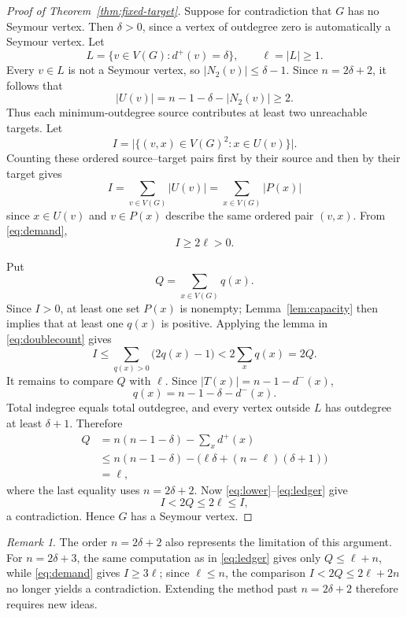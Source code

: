 \documentclass[12pt]{article}
\theoremstyle{plainsl}
\theoremstyle{remark}
\newtheorem*{remark}{Remark}
\begin{document}
\begin{proof}[Proof of Theorem~\ref{thm:fixed-target}]
Suppose for contradiction that $G$ has no Seymour vertex.  Then $\delta>0$,
since a vertex of outdegree zero is automatically a Seymour vertex.  Let
\[
 L=\{v\in V(G):d^+(v)=\delta\},
 \qquad \ell=|L|\ge1.
\]
Every $v\in L$ is not a Seymour vertex, so $|N_2(v)|\le\delta-1$.
Since $n=2\delta+2$, it follows that
\begin{equation}\label{eq:demand}
 |U(v)|=n-1-\delta-|N_2(v)|\ge2.
\end{equation}
Thus each minimum-outdegree source contributes at least two unreachable
targets. Let
\[
 I=\bigl|\{(v,x)\in V(G)^2:x\in U(v)\}\bigr|.
\]
Counting these ordered source--target pairs first by their source and then by
their target gives
\begin{equation}\label{eq:doublecount}
 I=\sum_{v\in V(G)}|U(v)|
 =\sum_{x\in V(G)}|P(x)|
\end{equation}
since $x\in U(v)$ and $v\in P(x)$ describe the
same ordered pair $(v,x)$.  From \eqref{eq:demand},
\begin{equation}\label{eq:lower}
 I\ge2\ell>0.
\end{equation}

\noindent Put
\[
 Q=\sum_{x\in V(G)}q(x).
\]
Since $I>0$, at least one set $P(x)$ is nonempty; Lemma~\ref{lem:capacity}
then implies that at least one $q(x)$ is positive.  Applying the lemma
in \eqref{eq:doublecount} gives
\begin{equation}\label{eq:capacity}
 I\le\sum_{q(x)>0}\bigl(2q(x)-1\bigr)
   <2\sum_xq(x)=2Q.
\end{equation}
It remains to compare $Q$ with $\ell$.  Since
$|T(x)|=n-1-d^-(x)$,
\[
 q(x)=n-1-\delta-d^-(x).
\]
Total indegree equals total outdegree, and every vertex outside $L$ has
outdegree at least $\delta+1$.  Therefore
\begin{equation}\label{eq:ledger}
\begin{aligned}
 Q
 &=n(n-1-\delta)-\sum_xd^+(x)\\
 &\le n(n-1-\delta)
   -\bigl(\ell\delta+(n-\ell)(\delta+1)\bigr)\\
 &=\ell,
\end{aligned}
\end{equation}
where the last equality uses $n=2\delta+2$.
Now \eqref{eq:lower}--\eqref{eq:ledger} give
\[
 I<2Q\le2\ell\le I,
\]
a contradiction.  Hence $G$ has a Seymour vertex.
\end{proof}

\begin{remark}
The order $n=2\delta+2$ also represents the limitation of this argument.  For
$n=2\delta+3$, the same computation as in \eqref{eq:ledger} gives only
$Q\le\ell+n$, while \eqref{eq:demand} gives $I\ge3\ell$; since $\ell\le n$,
the comparison $I<2Q\le2\ell+2n$ no longer yields a contradiction.  Extending
the method past $n=2\delta+2$ therefore requires new ideas.
\end{remark}
\end{document}
